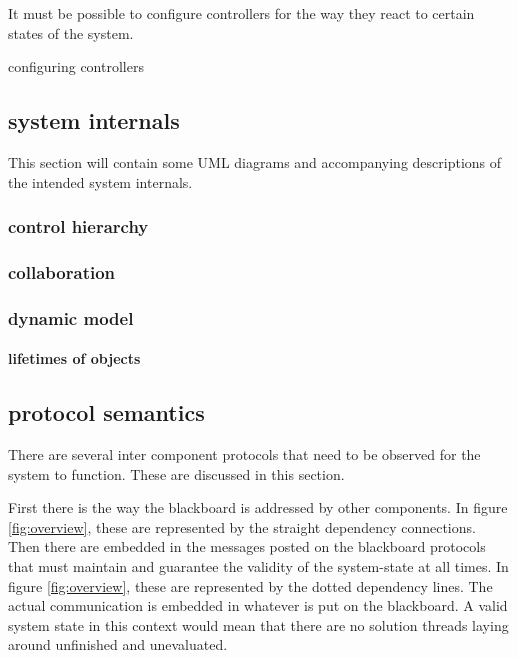 \documentclass[]{lofar}
\begin{document}
        \begin{requirement}
          It must be possible to configure controllers for the way
          they react to certain states of the system.
          \footnotemark[\value{footnote}]
          \caption{configuring controllers\label{req:configure-controllers}}
        \end{requirement}

    \subsection{system internals}

      This section will contain some UML diagrams and accompanying
      descriptions of the intended system internals.

      \subsubsection{control hierarchy}

      \subsubsection{collaboration}

      \subsubsection{dynamic model}

        \paragraph{lifetimes of objects}

    \subsection{protocol semantics}

      There are several inter component protocols that need to be
      observed for the system to function. These are discussed in this
      section.

      First there is the way the blackboard is addressed by other
      components. In figure
      \hyperlink{fig:overview}{\ref{fig:overview}}, these are
      represented by the straight dependency connections. Then there
      are embedded in the messages posted on the blackboard protocols
      that must maintain and guarantee the validity of the
      system-state at all times. In figure
      \hyperlink{fig:overview}{\ref{fig:overview}}, these are
      represented by the dotted dependency lines. The actual
      communication is embedded in whatever is put on the
      blackboard. A valid system state in this context would mean that
      there are no solution threads laying around unfinished and
      unevaluated.
\end{document}
